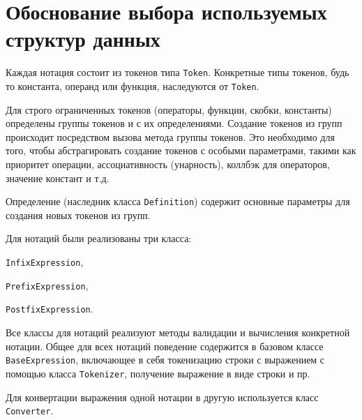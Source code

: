 \section*{Обоснование выбора используемых структур данных}

Каждая нотация состоит из токенов типа \verb|Token|.
Конкретные типы токенов, будь то константа, операнд или функция,
наследуются от \verb|Token|.

Для строго ограниченных токенов
(операторы, функции, скобки, константы)
определены группы токенов и с их определениями.
Создание токенов из групп происходит
посредством вызова метода группы токенов.
Это необходимо для того, чтобы абстрагировать
создание токенов с особыми параметрами,
такими как приоритет операции,
ассоциативность (унарность),
коллбэк для операторов,
значение констант и т.д.

Определение (наследник класса \verb|Definition|)
содержит основные параметры для создания новых токенов из групп.

Для нотаций были реализованы три класса:

\verb|InfixExpression|,

\verb|PrefixExpression|,

\verb|PostfixExpression|.

Все классы для нотаций реализуют методы валидации и
вычисления конкретной нотации.
Общее для всех нотаций поведение содержится в базовом классе
\verb|BaseExpression|, включающее в себя
токенизацию строки с выражением с помощью класса \verb|Tokenizer|,
получение выражение в виде строки
и пр.

Для конвертации выражения одной нотации в другую
используется класс \verb|Converter|.

